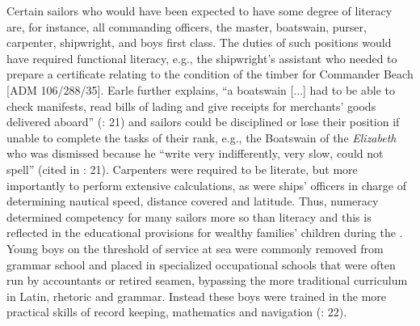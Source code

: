 Certain sailors who would have been expected to have some degree of literacy are, for instance, all commanding officers, the master, boatswain, purser, carpenter, shipwright, and boys first class. The duties of such positions would have required functional literacy, e.g., the shipwright’s assistant who needed to prepare a certificate relating to the condition of the timber for Commander Beach [ADM 106/288/35]. Earle further explains, “a boatswain [...] had to be able to check manifests, read bills of lading and give receipts for merchants’ goods delivered aboard” (\citeyear*{Earle1998}: 21) and sailors could be disciplined or lose their position if unable to complete the tasks of their rank, e.g., the Boatswain of the \textit{Elizabeth} who was dismissed because he “write very indifferently, very slow, could not spell” (cited in \citealt{Earle1998}: 21). Carpenters were required to be literate, but more importantly to perform extensive calculations, as were ships’ officers in charge of determining nautical speed, distance covered and latitude. Thus, numeracy determined competency for many sailors more so than literacy and this is reflected in the educational provisions for wealthy families’ children during the . Young boys on the threshold of service at sea were commonly removed from grammar school and placed in specialized occupational schools that were often run by accountants or retired seamen, bypassing the more traditional curriculum in Latin, rhetoric and grammar.  Instead these boys were trained in the more practical skills of record keeping, mathematics and navigation (\citealt{Earle1998}: 22). 

